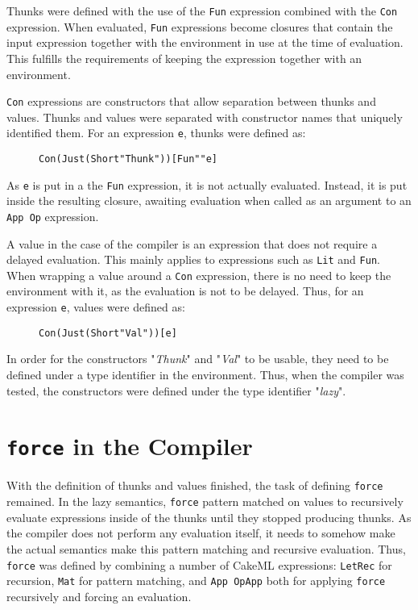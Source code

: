 Thunks were defined with the use of the \texttt{Fun} expression combined
with the \texttt{Con} expression. When evaluated, \texttt{Fun} expressions
become closures that contain the input expression together with the environment
in use at the time of evaluation. This fulfills the requirements of keeping
the expression together with an environment.

\texttt{Con} expressions are constructors that allow separation between thunks
and values. Thunks and values were separated with constructor names that
uniquely identified them. For an expression \texttt{e}, thunks were defined as:

\begin{figure}[H]
\begin{alltt}
  Con (Just (Short "Thunk")) [Fun "" e]
\end{alltt}
\end{figure}

\noindent As \texttt{e} is put in a the \texttt{Fun} expression, it is not
actually evaluated. Instead, it is put inside the resulting closure, awaiting
evaluation when called as an argument to an \texttt{App Op} expression.

A value in the case of the compiler is an expression that does not require
a delayed evaluation. This mainly applies to expressions such as \texttt{Lit}
and \texttt{Fun}. When wrapping a value around a \texttt{Con} expression, there
is no need to keep the environment with it, as the evaluation is not to be
delayed. Thus, for an expression \texttt{e}, values were defined as:

\begin{figure}[H]
\begin{alltt}
  Con (Just (Short "Val")) [e]
\end{alltt}
\end{figure}

In order for the constructors "\textit{Thunk}" and "\textit{Val}" to be usable,
they need to be defined under a type identifier in the environment. Thus,
when the compiler was tested, the constructors were defined under the type
identifier "\textit{lazy}".

\section{\texttt{force} in the Compiler}
With the definition of thunks and values finished, the task of defining
\texttt{force} remained. In the lazy semantics, \texttt{force} pattern
matched on values to recursively evaluate expressions inside of the thunks until
they stopped producing thunks. As the compiler does not perform any evaluation
itself, it needs to somehow make the actual semantics make this pattern matching
and recursive evaluation. Thus, \texttt{force} was defined by combining a number
of CakeML expressions: \texttt{LetRec} for recursion, \texttt{Mat} for pattern
matching, and \texttt{App OpApp} both for applying \texttt{force} recursively
and forcing an evaluation.

